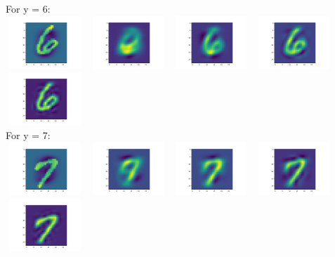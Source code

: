 \documentclass{article}
\begin{document}
For y = 6: \\
\includegraphics[width=3cm, height=2cm]{plots/A6e/A6e_13.png}
\includegraphics[width=3cm, height=2cm]{plots/A6e/A6e_13_5.png}
\includegraphics[width=3cm, height=2cm]{plots/A6e/A6e_13_15.png}
\includegraphics[width=3cm, height=2cm]{plots/A6e/A6e_13_40.png}
\includegraphics[width=3cm, height=2cm]{plots/A6e/A6e_13_100.png} \\
For y = 7: \\
\includegraphics[width=3cm, height=2cm]{plots/A6e/A6e_15.png}
\includegraphics[width=3cm, height=2cm]{plots/A6e/A6e_15_5.png}
\includegraphics[width=3cm, height=2cm]{plots/A6e/A6e_15_15.png}
\includegraphics[width=3cm, height=2cm]{plots/A6e/A6e_15_40.png}
\includegraphics[width=3cm, height=2cm]{plots/A6e/A6e_15_100.png} \\
\end{document}
